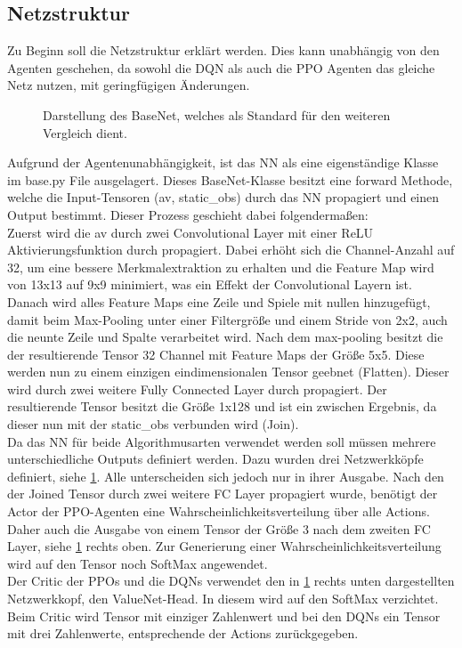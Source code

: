 \subsection{Netzstruktur}
Zu Beginn soll die Netzstruktur erklärt werden. Dies kann unabhängig von den Agenten geschehen, da sowohl die DQN als auch die PPO Agenten das gleiche Netz nutzen, mit geringfügigen Änderungen.
\begin{figure}[H]
	\centering
	\def\svgscale{0.80}
	
	\caption[BaseNet]{Darstellung des BaseNet, welches als Standard für den weiteren Vergleich dient.}
	\label{fig:Netzsturktur}
\end{figure}
Aufgrund der Agentenunabhängigkeit, ist das NN als eine eigenständige Klasse im base.py File ausgelagert. Dieses BaseNet-Klasse besitzt eine forward Methode, welche die Input-Tensoren (av, static\_obs) durch das NN propagiert und einen Output bestimmt. Dieser Prozess geschieht dabei folgendermaßen:\\
Zuerst wird die av durch zwei Convolutional Layer mit einer ReLU Aktivierungsfunktion durch propagiert. Dabei erhöht sich die Channel-Anzahl auf 32, um eine bessere Merkmalextraktion zu erhalten und die Feature Map wird von 13x13 auf 9x9 minimiert, was ein Effekt der Convolutional Layern ist. 
Danach wird alles Feature Maps eine Zeile und Spiele mit nullen hinzugefügt, damit beim Max-Pooling unter einer Filtergröße und einem Stride von 2x2, auch die neunte Zeile und Spalte verarbeitet wird. Nach dem max-pooling besitzt die der resultierende Tensor 32 Channel mit Feature Maps der Größe 5x5. Diese werden nun zu einem einzigen eindimensionalen Tensor geebnet (Flatten). Dieser wird durch zwei weitere Fully Connected Layer durch propagiert. Der resultierende Tensor besitzt die Größe 1x128 und ist ein zwischen Ergebnis, da dieser nun mit der static\_obs verbunden  wird (Join).\\
Da das NN für beide Algorithmusarten verwendet werden soll müssen mehrere unterschiedliche Outputs definiert werden. Dazu wurden drei Netzwerkköpfe definiert, siehe \ref{fig:Netzsturktur}. Alle unterscheiden sich jedoch nur in ihrer Ausgabe. Nach den der Joined Tensor durch zwei weitere FC Layer propagiert wurde, benötigt der Actor der PPO-Agenten eine Wahrscheinlichkeitsverteilung über alle Actions. Daher auch die Ausgabe von einem Tensor der Größe 3 nach dem zweiten FC Layer, siehe \ref{fig:Netzsturktur} rechts oben. Zur Generierung einer Wahrscheinlichkeitsverteilung wird auf den Tensor noch SoftMax angewendet.\\
Der Critic der PPOs und die DQNs verwendet den in \ref{fig:Netzsturktur} rechts unten dargestellten Netzwerkkopf, den ValueNet-Head. In diesem wird auf den SoftMax verzichtet. Beim Critic wird Tensor mit einziger Zahlenwert und bei den DQNs ein Tensor mit drei Zahlenwerte, entsprechende der Actions zurückgegeben.


